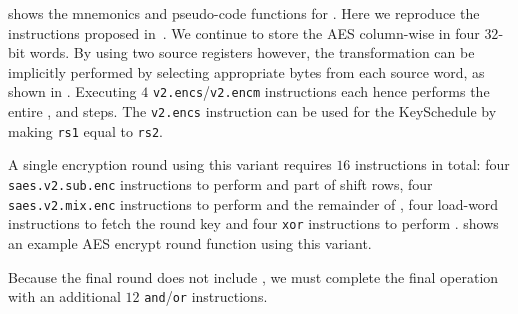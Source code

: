 
 shows the mnemonics and pseudo-code functions
for .
Here we reproduce the instructions proposed in~\cite[Section 4.3]{TilGro:06}.
We continue to store the AES column-wise in four $32$-bit words.
By using two source registers however,
the  transformation can be implicitly performed by selecting
appropriate bytes from each source word, as shown in
.
Executing $4$  {\tt v2.encs}/{\tt v2.encm} instructions each hence
performs the entire ,  and  steps.
The {\tt v2.encs} instruction can be used for the KeySchedule by
making {\tt rs1} equal to {\tt rs2}.

A single encryption round using this variant requires $16$ instructions
in total:
four {\tt saes.v2.sub.enc} instructions to perform  and part of
shift rows,
four {\tt saes.v2.mix.enc} instructions to perform  and the
remainder of ,
four load-word instructions to fetch the round key
and
four {\tt xor} instructions to perform .
 shows an example AES encrypt round function
using this variant.

Because the final round does not include , we must
complete the final  operation with an additional
$12$ {\tt and}/{\tt or} instructions.

